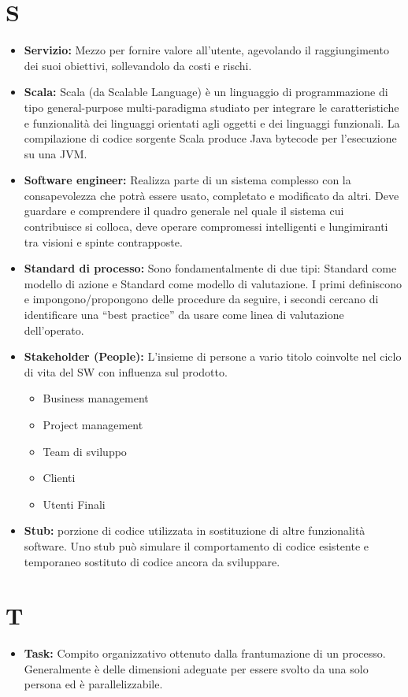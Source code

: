 \documentclass[a4paper]{article}
\begin{document}
	\section*{S}
		\begin{itemize}
			\item \textbf{Servizio:} Mezzo per fornire valore all'utente, agevolando il raggiungimento dei suoi obiettivi, 
			sollevandolo da costi e rischi.
			\item \textbf{Scala:} Scala (da Scalable Language) è un linguaggio di programmazione di tipo general-purpose
			 multi-paradigma studiato per integrare le caratteristiche e funzionalità dei linguaggi orientati agli oggetti e dei linguaggi
			  funzionali. La compilazione di codice sorgente Scala produce Java bytecode per l'esecuzione su una JVM.
			\item \textbf{Software engineer:} Realizza parte di un sistema complesso con la consapevolezza che potrà essere 
			usato, completato e modificato da altri. Deve guardare e comprendere il quadro generale nel quale il sistema cui 
			contribuisce si colloca, deve operare compromessi intelligenti e lungimiranti tra visioni e spinte contrapposte.
			\item \textbf{Standard di processo:} Sono fondamentalmente di due tipi: Standard come modello di azione e Standard 
			come modello di valutazione. I primi definiscono e impongono/propongono delle procedure da seguire, i secondi 
			cercano di identificare una “best practice” da usare come linea di valutazione dell’operato.
			\item \textbf{Stakeholder (People):} L’insieme di persone a vario titolo coinvolte nel ciclo di vita del SW con 
			influenza sul prodotto.
			\begin{itemize}
				\item  Business management
			  	\item  Project management
			  	\item  Team di sviluppo
			  	\item  Clienti
			  	\item  Utenti Finali
			\end{itemize}
			\item \textbf{Stub:} porzione di codice utilizzata in sostituzione di altre funzionalità software. Uno stub può 
			simulare il comportamento di codice esistente e temporaneo sostituto di codice ancora da sviluppare.			
		\end{itemize}
		
	\section*{T}
		\begin{itemize}	
			\item \textbf{Task:} Compito organizzativo ottenuto dalla frantumazione di un processo. Generalmente è delle 
			dimensioni adeguate per essere svolto da una solo persona ed è parallelizzabile.
		\end{itemize}
		
\end{document}
